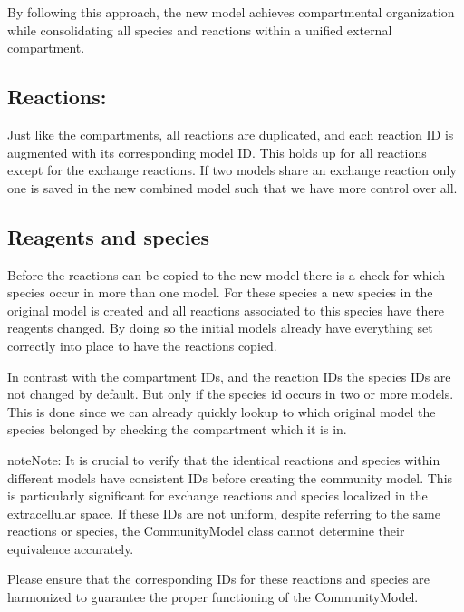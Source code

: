 \documentclass[letterpaper,10pt,english]{sphinxmanual}
\begin{document}
\sphinxAtStartPar
By following this approach, the new model achieves compartmental organization while consolidating all species and reactions
within a unified external compartment.


\subsection{Reactions:}
\label{\detokenize{4_community_matrix/home:reactions}}
\sphinxAtStartPar
Just like the compartments, all reactions are duplicated, and each reaction ID is augmented with its corresponding model ID. This
holds up for all reactions except for the exchange reactions. If two models share an exchange reaction only one is saved in the new
combined model such that we have more control over all.


\subsection{Reagents and species}
\label{\detokenize{4_community_matrix/home:reagents-and-species}}
\sphinxAtStartPar
Before the reactions can be copied to the new model there is a check for which species occur in more than one model.
For these species a new species in the original model is created and all reactions associated to this species have there reagents changed.
By doing so the initial models already have everything set correctly into place to have the reactions copied.

\sphinxAtStartPar
In contrast with the compartment IDs, and the reaction IDs the species IDs are not changed by default. But only if the species id
occurs in two or more models. This is done since we can already quickly lookup to which original model the species belonged by checking
the compartment which it is in.

\begin{sphinxadmonition}{note}{Note:}
\sphinxAtStartPar
It is crucial to verify that the identical reactions and species within different models have consistent IDs before
creating the community model. This is particularly significant for exchange reactions and species localized in the
extracellular space. If these IDs are not uniform, despite referring to the same reactions or species, the CommunityModel
class cannot determine their equivalence accurately.

\sphinxAtStartPar
Please ensure that the corresponding IDs for these reactions and species are harmonized to guarantee the proper
functioning of the CommunityModel.
\end{sphinxadmonition}
\end{document}
